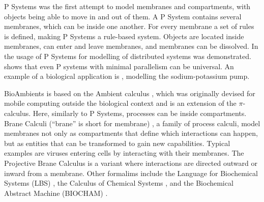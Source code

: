 P Systems \cite{psystems} was the first attempt to model membranes and compartments, with objects being able to move in and out of them. A P System contains several membranes, which can be inside one another. For every membrane a set of rules is defined, making P Systems a rule-based system. Objects are located inside membranes, can enter and leave membranes, and membranes can be dissolved. In \cite{CIOBANU2003123} the usage of P Systems for modelling of distributed systems was demonstrated. \cite{CIOBANU2007117} shows that even P systems with minimal parallelism can be universal. An example of a biological application is \cite{10.1007/978-3-540-31837-8_12}, modelling the sodium-potassium pump. 

BioAmbients \cite{RegevBioambients} is based on the Ambient calculus \cite{CARDELLI2000177}, which was originally devised for mobile computing outside the biological context and is an extension of the $\pi$-calculus. Here, similarly to P Systems, processes can be inside compartments.%
Brane Calculi (``brane'' is short for membrane) \cite{CardelliMobileAmbients}, a family of process calculi, model membranes not only as compartments that define which interactions can happen, but as entities that can be transformed to gain new capabilities. Typical examples are viruses entering cells by interacting with their membranes. The Projective Brane Calculus \cite{ProjectiveBrane} is a variant where interactions are directed outward or inward from a membrane. Other formalims include the Language for Biochemical Systems (LBS) \cite{PlotkinLBS}, the Calculus of Chemical Systems \cite{PlotkinCCS}, and the Biochemical Abstract Machine (BIOCHAM) \cite{biocham}. 

